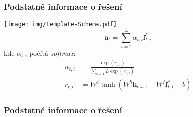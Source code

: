 




\begin{frame}
  \frametitle{Podstatné informace o řešení}
  \centering\texttt{[image: img/template-Schema.pdf]}
  \begin{equation}
      \mathbf{a}_t = \sum_{i=1}^{L}\alpha_{t,i}\mathbf{f}_{t,i}^{*}
  \end{equation}
  kde $\alpha_{t,i}$ počítá \emph{softmax}:
  \begin{align}
      \alpha_{t,i} &= \frac{\exp(r_{t,i})}{\sum_{k=1}{L}\exp(r_{t,k})} 
      \\
      r_{t,i} &= W^a \tanh\left( W^h \mathbf{h}_{t-1} + W^f\mathbf{f}_{t,i}^{*} + b \right)
  \end{align}
\end{frame}

\begin{frame}\frametitle{Podstatné informace o řešení}
\end{frame}




